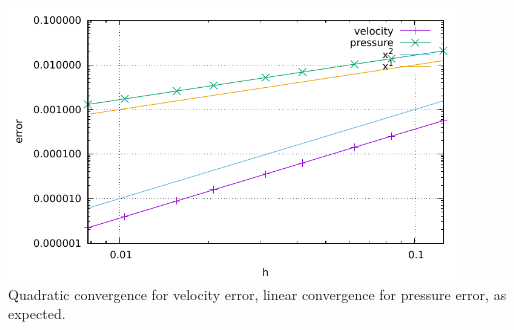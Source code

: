 \begin{center}
\includegraphics[width=12cm]{python_codes/fieldstone_01/errors.pdf}\\
Quadratic convergence for velocity error, 
linear convergence for pressure error, as expected.
\end{center}

